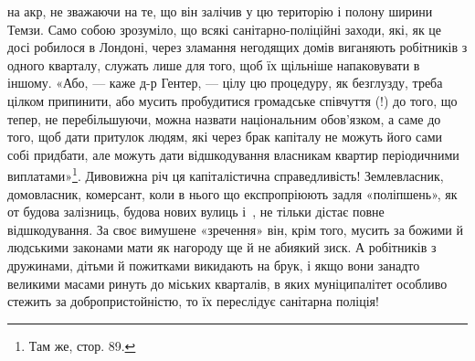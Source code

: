 \parcont{}  %
на акр, не зважаючи на те, що він залічив у цю територію і полону
ширини Темзи. Само собою зрозуміло, що всякі санітарно-поліційні
заходи, які, як це досі робилося в Лондоні, через
зламання негодящих домів виганяють робітників з одного кварталу,
служать лише для того, щоб їх щільніше напаковувати
в іншому. «Або, — каже д-р Гентер, — цілу цю процедуру,
як безглузду, треба цілком припинити, або мусить пробудитися
громадське співчуття (!) до того, що тепер, не перебільшуючи,
можна назвати національним обов’язком, а саме до того, щоб
дати притулок людям, які через брак капіталу не можуть його
сами собі придбати, але можуть дати відшкодування власникам
квартир періодичними виплатами»\footnote{
Там же, стор. 89.
}. Дивовижна річ ця капіталістична
справедливість! Землевласник, домовласник, комерсант,
коли в нього що експропріюють задля «поліпшень», як от
будова залізниць, будова нових вулиць і~, не тільки дістає
повне відшкодування. За своє вимушене «зречення» він, крім
того, мусить за божими й людськими законами мати як нагороду
ще й не абиякий зиск. А робітників з дружинами, дітьми й пожитками
викидають на брук, і якщо вони занадто великими масами
ринуть до міських кварталів, в яких муніципалітет особливо
стежить за добропристойністю, то їх переслідує санітарна поліція!

